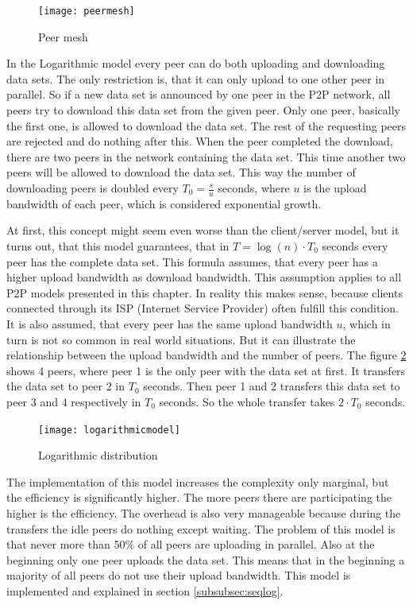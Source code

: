 \begin{figure}[H]
\centering
\texttt{[image: peermesh]}
\caption{Peer mesh}
\label{fig:peermesh}
\end{figure}

In the Logarithmic model every peer can do both uploading and downloading data sets. The only restriction is, that it can only upload to one other peer in parallel. So if a new data set is announced by one peer in the P2P network, all peers try to download this data set from the given peer. Only one peer, basically the first one, is allowed to download the data set. The rest of the requesting peers are rejected and do nothing after this. When the peer completed the download, there are two peers in the network containing the data set. This time another two peers will be allowed to download the data set. This way the number of downloading peers is doubled every $T_0 = \frac{s}{u}$ seconds, where $u$ is the upload bandwidth of each peer, which is considered exponential growth.

At first, this concept might seem even worse than the client/server model, but it turns out, that this model guarantees, that in $T=\log{(n)} \cdot T_0$  seconds every peer has the complete data set. This formula assumes, that every peer has a higher upload bandwidth as download bandwidth. This assumption applies to all P2P models presented in this chapter. In reality this makes sense, because clients connected through its ISP (Internet Service Provider) often fulfill this condition. It is also assumed, that every peer has the same upload bandwidth $u$, which in turn is not so common in real world situations. But it can illustrate the relationship between the upload bandwidth and the number of peers. The figure \ref{fig:logarithmicmodel} shows 4 peers, where peer 1 is the only peer with the data set at first. It transfers the data set to peer 2 in $T_0$ seconds. Then peer 1 and 2 transfers this data set to peer 3 and 4 respectively in $T_0$ seconds. So the whole transfer takes $2 \cdot T_0$ seconds.

\begin{figure}[H]
\centering
\texttt{[image: logarithmicmodel]}
\caption{Logarithmic distribution}
\label{fig:logarithmicmodel}
\end{figure}

The implementation of this model increases the complexity only marginal, but the efficiency is significantly higher. The more peers there are participating the higher is the efficiency. The overhead is also very manageable because during the transfers the idle peers do nothing except waiting. The problem of this model is that never more than 50\% of all peers are uploading in parallel. Also at the beginning only one peer uploads the data set. This means that in the beginning a majority of all peers do not use their upload bandwidth. This model is implemented and explained in section \ref{subsubsec:seqlog}.

